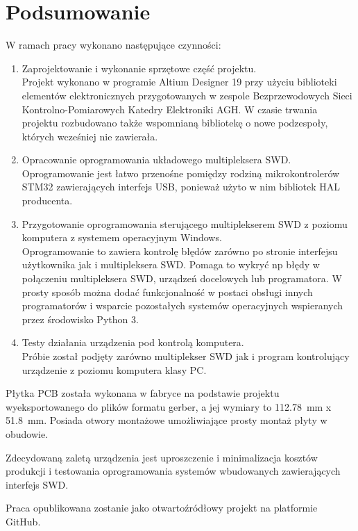 \chapter{Podsumowanie}

W ramach pracy wykonano następujące czynności:
\begin{enumerate}
    \item Zaprojektowanie i wykonanie sprzętowe część projektu.\\
    Projekt wykonano w programie Altium Designer 19 przy użyciu biblioteki elementów elektronicznych przygotowanych w zespole Bezprzewodowych Sieci Kontrolno-Pomiarowych Katedry Elektroniki AGH. W czasie trwania projektu rozbudowano także wspomnianą bibliotekę o nowe podzespoły, których wcześniej nie zawierała. 
    \item Opracowanie oprogramowania układowego multipleksera SWD.\\ Oprogramowanie jest łatwo przenośne pomiędzy rodziną mikrokontrolerów STM32 zawierających interfejs USB, ponieważ użyto w nim bibliotek HAL producenta.
    \item Przygotowanie oprogramowania sterującego multiplekserem SWD z poziomu komputera z systemem operacyjnym Windows.\\
    Oprogramowanie to zawiera kontrolę błędów zarówno po stronie interfejsu użytkownika jak i multipleksera SWD. Pomaga to wykryć np błędy w połączeniu multipleksera SWD, urządzeń docelowych lub programatora. W prosty sposób można dodać funkcjonalność w postaci obsługi innych programatorów i wsparcie pozostałych systemów operacyjnych wspieranych przez środowisko Python 3.
    \item Testy działania urządzenia pod kontrolą komputera.\\
    Próbie został podjęty zarówno multiplekser SWD jak i program kontrolujący urządzenie z poziomu komputera klasy PC.
\end{enumerate}

Płytka PCB została wykonana w fabryce na podstawie projektu wyeksportowanego do plików formatu gerber, a jej wymiary to \SI{112.78}{mm} x \SI{51.8}{mm}.
Posiada otwory montażowe umożliwiające prosty montaż płyty w obudowie.

Zdecydowaną zaletą urządzenia jest uproszczenie i minimalizacja kosztów produkcji i testowania oprogramowania systemów wbudowanych zawierających interfejs SWD.

Praca opublikowana zostanie jako otwartoźródłowy projekt na platformie GitHub.


